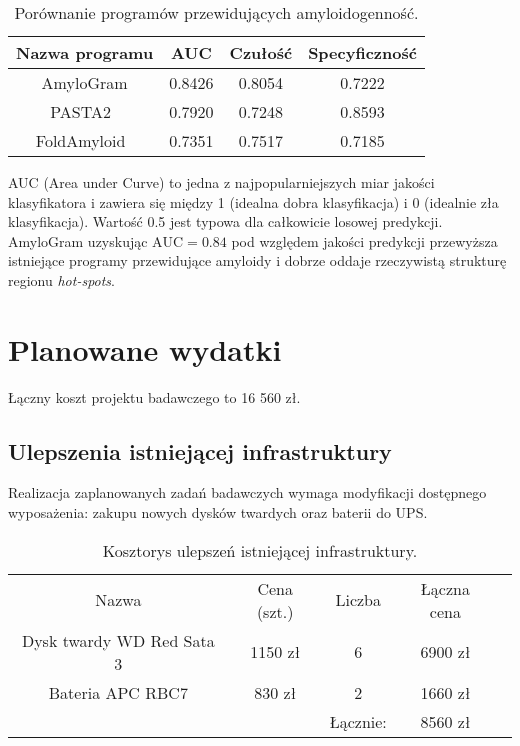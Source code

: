 \documentclass{article}
\begin{document}
\begin{table}[!htbp]
\centering
\caption*{Porównanie programów przewidujących amyloidogenność.} 
\begin{tabular}{c|c|c|c}
  \hline
Nazwa programu & AUC & Czułość & Specyficzność \\ 
  \hline
AmyloGram & 0.8426 & 0.8054 & 0.7222 \\ 
PASTA2~\citep{walsh_pasta_2014} & 0.7920 & 0.7248 & 0.8593 \\ 
  FoldAmyloid~\citep{Garbuzynskiy2010} & 0.7351 & 0.7517 & 0.7185 \\ 
   \hline
\end{tabular}
\end{table}

AUC (Area under Curve) to jedna z najpopularniejszych miar jakości klasyfikatora i zawiera się między 1 (idealna dobra klasyfikacja) i 0 (idealnie zła klasyfikacja). Wartość 0.5 jest typowa dla całkowicie losowej predykcji. AmyloGram uzyskując $\textrm{AUC} = 0.84$ pod względem jakości predykcji przewyższa istniejące programy przewidujące amyloidy i dobrze oddaje rzeczywistą strukturę regionu \textit{hot-spots}.



\section{Planowane wydatki}

Łączny koszt projektu badawczego to 16 560 zł.

\subsection{Ulepszenia istniejącej infrastruktury}

Realizacja zaplanowanych zadań badawczych wymaga modyfikacji dostępnego wyposażenia: zakupu nowych dysków twardych oraz baterii do UPS.

\begin{table}[!htbp]
\centering
\caption*{Kosztorys ulepszeń istniejącej infrastruktury.}
\begin{tabular}{ccccc}
\cline{1-4}
\multicolumn{1}{|c|}{Nazwa}                     & \multicolumn{1}{c|}{Cena (szt.)} & \multicolumn{1}{c|}{Liczba} & \multicolumn{1}{c|}{Łączna cena} &  \\ \cline{1-4}
\multicolumn{1}{|c|}{Dysk twardy WD Red Sata 3} & \multicolumn{1}{c|}{1150 zł}     & \multicolumn{1}{c|}{6}      & \multicolumn{1}{c|}{6900 zł}     &  \\ \cline{1-4}
\multicolumn{1}{|c|}{Bateria APC RBC7}          & \multicolumn{1}{c|}{830 zł}      & \multicolumn{1}{c|}{2}      & \multicolumn{1}{c|}{1660 zł}     &  \\ \cline{1-4}
                                                &                                  & Łącznie:                    & 8560 zł                          & 
\end{tabular}
\end{table}
\end{document}
